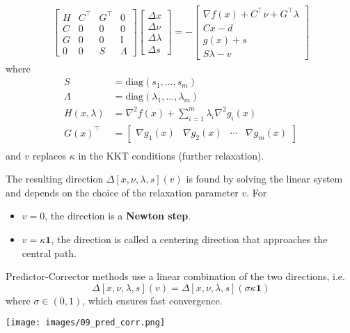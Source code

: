 \begin{align*}
    \begin{bmatrix}
        H & C^\top & {G}^\top & 0          \\
        C & 0      & 0        & 0          \\
        G & 0      & 0        & \mathbb{I} \\
        0 & 0      & S        & \Lambda
    \end{bmatrix}
    \begin{bmatrix}
        \Delta x      \\
        \Delta\nu     \\
        \Delta\lambda \\
        \Delta s
    \end{bmatrix}=-
    \begin{bmatrix}
        \nabla f(x)+C^\top\nu+{G}^\top\lambda \\
        Cx-d                                  \\
        g(x)+s                                \\
        S\lambda-v
    \end{bmatrix}
\end{align*}
where
\begin{align*}
    S            & = \mathrm{diag}(s_1, \ldots, s_m)                          \\
    \Lambda      & = \mathrm{diag}(\lambda_1, \ldots, \lambda_m)              \\
    H(x,\lambda) & = \nabla^2 f(x) + \sum_{i=1}^{m} \lambda_i \nabla^2 g_i(x) \\
    {G(x)}^\top  & = \begin{bmatrix}
                         \nabla g_1(x) & \nabla g_2(x) & \cdots & \nabla g_m(x)
                     \end{bmatrix}   \\
\end{align*}
and $v$ replaces $\kappa$ in the KKT conditions (further relaxation).

\newpar{}
The resulting direction $\Delta [x,\nu,\lambda,s](v)$ is found by solving the linear system and depends on the choice of the relaxation parameter $v$.
For
\begin{itemize}
    \item $v=0$, the direction is a \textbf{Newton step}.
    \item $v=\kappa \mathbf{1}$, the direction is called a centering direction that approaches the central path.
\end{itemize}

\newpar{}

Predictor-Corrector methods use a linear combination of the two directions, i.e.\
\begin{equation*}
    \Delta [x,\nu,\lambda,s](v) =\Delta [x,\nu,\lambda,s](\sigma\kappa \mathbf{1})
\end{equation*}
where $\sigma\in (0,1)$, which ensures fast convergence.
\begin{center}
    \texttt{[image: images/09\_pred\_corr.png]}
\end{center}